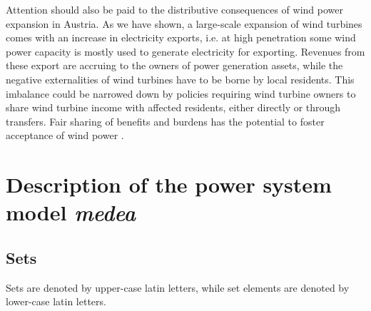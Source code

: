 \documentclass[review, 3p, times, 12pt]{elsarticle} %
\begin{document}
Attention should also be paid to the distributive consequences of wind power expansion in Austria.
As we have shown, a large-scale expansion of wind turbines comes with an increase in electricity exports, i.e. at high penetration some wind power capacity is mostly used to generate electricity for exporting.
Revenues from these export are accruing to the owners of power generation assets, while the negative externalities of wind turbines have to be borne by local residents.
This imbalance could be narrowed down by policies requiring wind turbine owners to share wind turbine income with affected residents, either directly or through transfers.
Fair sharing of benefits and burdens has the potential to foster acceptance of wind power \citep{Scherhaufer2017}.


\newpage



\newpage
\appendix


\section{Description of the power system model \emph{medea}}\label{sec:medea-desc}

\subsection{Sets}\label{sets}
Sets are denoted by upper-case latin letters, while set elements are denoted by lower-case latin letters.
\end{document}
